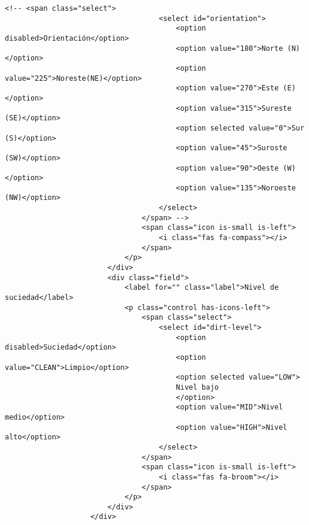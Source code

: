 \begin{lstlisting}[style=ES6, caption={public/index.html}]
                                <!-- <span class="select">
                                    <select id="orientation">
                                        <option disabled>Orientación</option>
                                        <option value="180">Norte (N)</option>
                                        <option value="225">Noreste(NE)</option>
                                        <option value="270">Este (E)</option>
                                        <option value="315">Sureste (SE)</option>
                                        <option selected value="0">Sur (S)</option>
                                        <option value="45">Suroste (SW)</option>
                                        <option value="90">Oeste (W)</option>
                                        <option value="135">Noroeste (NW)</option>
                                    </select>
                                </span> -->
                                <span class="icon is-small is-left">
                                    <i class="fas fa-compass"></i>
                                </span>
                            </p>
                        </div>
                        <div class="field">
                            <label for="" class="label">Nivel de suciedad</label>
                            <p class="control has-icons-left">
                                <span class="select">
                                    <select id="dirt-level">
                                        <option disabled>Suciedad</option>
                                        <option value="CLEAN">Limpio</option>
                                        <option selected value="LOW">
                                        Nivel bajo
                                        </option>
                                        <option value="MID">Nivel medio</option>
                                        <option value="HIGH">Nivel alto</option>
                                    </select>
                                </span>
                                <span class="icon is-small is-left">
                                    <i class="fas fa-broom"></i>
                                </span>
                            </p>
                        </div>
                    </div>


\end{lstlisting}
